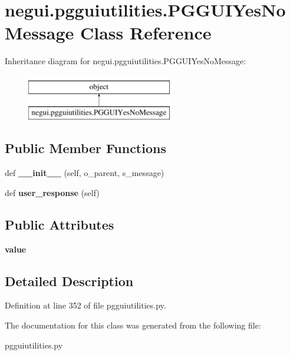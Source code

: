 \hypertarget{classnegui_1_1pgguiutilities_1_1PGGUIYesNoMessage}{}\section{negui.\+pgguiutilities.\+P\+G\+G\+U\+I\+Yes\+No\+Message Class Reference}
\label{classnegui_1_1pgguiutilities_1_1PGGUIYesNoMessage}
Inheritance diagram for negui.\+pgguiutilities.\+P\+G\+G\+U\+I\+Yes\+No\+Message\+:\begin{figure}[H]
\begin{center}
\leavevmode
\includegraphics[height=2.000000cm]{classnegui_1_1pgguiutilities_1_1PGGUIYesNoMessage}
\end{center}
\end{figure}
\subsection*{Public Member Functions}
\begin{DoxyCompactItemize}
\item 
def {\bfseries \+\_\+\+\_\+init\+\_\+\+\_\+} (self, o\+\_\+parent, s\+\_\+message)\hypertarget{classnegui_1_1pgguiutilities_1_1PGGUIYesNoMessage_a5e0a85036be6a2e3e95bef3cbb47781f}{}\label{classnegui_1_1pgguiutilities_1_1PGGUIYesNoMessage_a5e0a85036be6a2e3e95bef3cbb47781f}

\item 
def {\bfseries user\+\_\+response} (self)\hypertarget{classnegui_1_1pgguiutilities_1_1PGGUIYesNoMessage_a04daf167d136140624e51eb25f6a4f90}{}\label{classnegui_1_1pgguiutilities_1_1PGGUIYesNoMessage_a04daf167d136140624e51eb25f6a4f90}

\end{DoxyCompactItemize}
\subsection*{Public Attributes}
\begin{DoxyCompactItemize}
\item 
{\bfseries value}\hypertarget{classnegui_1_1pgguiutilities_1_1PGGUIYesNoMessage_add89e39d7bc633972ece1a90e18a66d1}{}\label{classnegui_1_1pgguiutilities_1_1PGGUIYesNoMessage_add89e39d7bc633972ece1a90e18a66d1}

\end{DoxyCompactItemize}


\subsection{Detailed Description}


Definition at line 352 of file pgguiutilities.\+py.



The documentation for this class was generated from the following file\+:\begin{DoxyCompactItemize}
\item 
pgguiutilities.\+py\end{DoxyCompactItemize}

